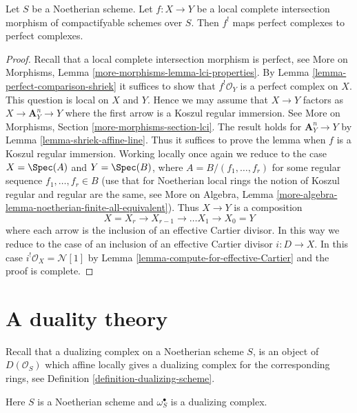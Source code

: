 \begin{lemma}
\label{lemma-lci-shriek}
Let $S$ be a Noetherian scheme. Let $f : X \to Y$ be a local complete
intersection morphism of compactifyable schemes over $S$. Then $f^!$
maps perfect complexes to perfect complexes.
\end{lemma}

\begin{proof}
Recall that a local complete intersection morphism is perfect, see
More on Morphisms, Lemma \ref{more-morphisms-lemma-lci-properties}.
By Lemma \ref{lemma-perfect-comparison-shriek} it suffices to show
that $f^!\mathcal{O}_Y$ is a perfect complex on $X$. This question
is local on $X$ and $Y$. Hence we may assume that $X \to Y$
factors as $X \to \mathbf{A}^n_Y \to Y$ where the first arrow is a
Koszul regular immersion. See More on Morphisms, Section
\ref{more-morphisms-section-lci}.
The result holds for $\mathbf{A}^n_Y \to Y$
by Lemma \ref{lemma-shriek-affine-line}. Thus it suffices to prove
the lemma when $f$ is a Koszul regular immersion.
Working locally once again we reduce to the case
$X = \Spec(A)$ and $Y = \Spec(B)$, where $A = B/(f_1, \ldots, f_r)$
for some regular sequence $f_1, \ldots, f_r \in B$
(use that for Noetherian local rings the notion of Koszul
regular and regular are the same, see
More on Algebra, Lemma
\ref{more-algebra-lemma-noetherian-finite-all-equivalent}).
Thus $X \to Y$ is a composition
$$
X = X_r \to X_{r - 1} \to \ldots X_1 \to X_0 = Y
$$
where each arrow is the inclusion of an effective Cartier divisor.
In this way we reduce to the case of an inclusion of an effective
Cartier divisor $i : D \to X$. In this case
$i^!\mathcal{O}_X = \mathcal{N}[1]$ by
Lemma \ref{lemma-compute-for-effective-Cartier} and the proof is complete.
\end{proof}






\section{A duality theory}
\label{section-duality}

\noindent
Recall that a dualizing complex on a Noetherian scheme $S$, is an
object of $D(\mathcal{O}_S)$ which affine locally gives a dualizing
complex for the corresponding rings, see
Definition \ref{definition-dualizing-scheme}.

\begin{situation}
\label{situation-dualizing}
Here $S$ is a Noetherian scheme and $\omega_S^\bullet$ is a dualizing
complex.
\end{situation}

